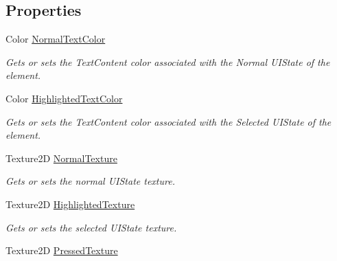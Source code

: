 \subsection*{Properties}
\begin{DoxyCompactItemize}
\item 
Color \hyperlink{class_midnight_blue_1_1_engine_1_1_u_i_1_1_u_i_control_element_a11c782ceedc17ca92ef6e479c504d96d}{Normal\+Text\+Color}
\begin{DoxyCompactList}\small\item\em Gets or sets the Text\+Content color associated with the Normal U\+I\+State of the element. \end{DoxyCompactList}\item 
Color \hyperlink{class_midnight_blue_1_1_engine_1_1_u_i_1_1_u_i_control_element_aef623a59907f990af21c32bd95c7a6ae}{Highlighted\+Text\+Color}
\begin{DoxyCompactList}\small\item\em Gets or sets the Text\+Content color associated with the Selected U\+I\+State of the element. \end{DoxyCompactList}\item 
Texture2D \hyperlink{class_midnight_blue_1_1_engine_1_1_u_i_1_1_u_i_control_element_aeb74d6760c269f3aa3ace852d4856de1}{Normal\+Texture}
\begin{DoxyCompactList}\small\item\em Gets or sets the normal U\+I\+State texture. \end{DoxyCompactList}\item 
Texture2D \hyperlink{class_midnight_blue_1_1_engine_1_1_u_i_1_1_u_i_control_element_abcbcffad4ffa1633a54848c7621472b4}{Highlighted\+Texture}
\begin{DoxyCompactList}\small\item\em Gets or sets the selected U\+I\+State texture. \end{DoxyCompactList}\item 
Texture2D \hyperlink{class_midnight_blue_1_1_engine_1_1_u_i_1_1_u_i_control_element_ace671a25fddbf14032e1ce7867a2022c}{Pressed\+Texture}

\end{DoxyCompactItemize}
